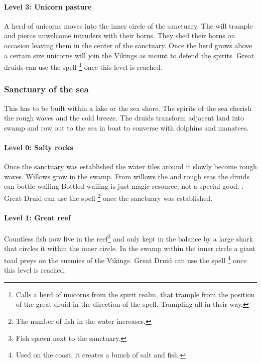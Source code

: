 \paragraph{Level 3: Unicorn pasture}
A herd of unicorns moves into the inner circle of the sanctuary. The will
trample and pierce unwelcome intruders with their horns. They shed their horns
on occasion leaving them in the center of the sanctuary. Once the herd grows
above a certain size unicorns will join the \gls{Vikings} as mount to defend
the spirits. Great druids can use the spell \footnote{ Calls a herd of unicorns from the spirit realm, that
	trample from the position of the great druid in the direction of the spell.
	Trampling all in their way. } once this level is reached.

\subsubsection{Sanctuary of the sea}\label{ch:Tribes:Vikings:Religion:Sea}
This has to be built within a lake or the sea shore. The spirits of the sea
cherish the rough waves and the cold breeze. The druids transform adjacent land
into swamp and row out to the sea in boat to converse with dolphins and
manatees.

\paragraph{Level 0: Salty rocks}
Once the sanctuary was established the water tiles around it slowly become
rough waves. Willows grow in the swamp. From willows the and rough seas the
druids can bottle wailing{ Bottled wailing is just magic resource, not a
		special good. }. Great Druid can use the spell \footnote{ The number of fish in the water increases, } once the
sanctuary was established.

\paragraph{Level 1: Great reef}
Countless fish now live in the reef\footnote{ Fish spawn next to the sanctuary.
} and only kept in the balance by a large shark that circles it within the
inner circle. In the swamp within the inner circle a giant toad preys on the
enemies of the \gls{Vikings}. Great Druid can use the spell \footnote{ Used on the coast, it creates a bunch of salt and fish. } once
this level is reached.

